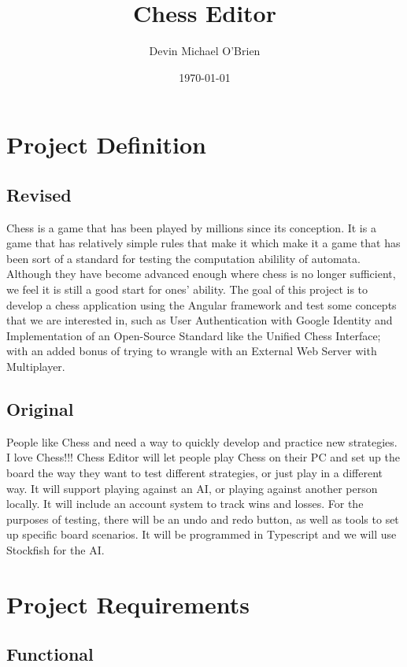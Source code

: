 \documentclass[11pt]{article}
\author{Devin Michael O'Brien}
\date{\today}
\title{Chess Editor}
\begin{document}
\maketitle
\tableofcontents

\section{Project Definition}
\label{sec:org8a0c159}
\subsection{Revised}
\label{sec:orgc0560b9}

Chess is a game that has been played by millions since its
conception. It is a game that has relatively simple rules that make it
which make it a game that has been sort of a standard for testing the
computation abilility of automata. Although they have become advanced
enough where chess is no longer sufficient, we feel it is still a good
start for ones' ability. The goal of this project is to develop a
chess application using the Angular framework and test some concepts
that we are interested in, such as User Authentication with Google
Identity and Implementation of an Open-Source Standard like the
Unified Chess Interface; with an added bonus of trying to wrangle with
an External Web Server with Multiplayer.

\subsection{Original}
\label{sec:org6fbddb8}
People like Chess and need a way to quickly develop and practice new strategies. I love
Chess!!! Chess Editor will let people play Chess on their PC and set up the board the
way they want to test different strategies, or just play in a different way. It will support
playing against an AI, or playing against another person locally. It will include an account
system to track wins and losses. For the purposes of testing, there will be an undo and
redo button, as well as tools to set up specific board scenarios. It will be programmed in
Typescript and we will use Stockfish for the AI.


\section{Project Requirements}
\label{sec:org2de7b2f}
\subsection{Functional}
\label{sec:orgcf17bd4}
\end{document}
